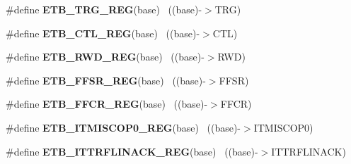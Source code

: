 \begin{DoxyCompactItemize}
\item 
\hypertarget{group___e_t_b___register___accessor___macros_ga01a52ef18993680d388fbd12372e86ca}{}\#define {\bfseries E\+T\+B\+\_\+\+T\+R\+G\+\_\+\+R\+E\+G}(base)                                            ~((base)-\/$>$T\+R\+G)\label{group___e_t_b___register___accessor___macros_ga01a52ef18993680d388fbd12372e86ca}

\item 
\hypertarget{group___e_t_b___register___accessor___macros_ga7a6e91a5568bfb417a9c335a6e43714f}{}\#define {\bfseries E\+T\+B\+\_\+\+C\+T\+L\+\_\+\+R\+E\+G}(base)                                            ~((base)-\/$>$C\+T\+L)\label{group___e_t_b___register___accessor___macros_ga7a6e91a5568bfb417a9c335a6e43714f}

\item 
\hypertarget{group___e_t_b___register___accessor___macros_ga0623a583f4196324a3f5ee3cac75f6a2}{}\#define {\bfseries E\+T\+B\+\_\+\+R\+W\+D\+\_\+\+R\+E\+G}(base)                                            ~((base)-\/$>$R\+W\+D)\label{group___e_t_b___register___accessor___macros_ga0623a583f4196324a3f5ee3cac75f6a2}

\item 
\hypertarget{group___e_t_b___register___accessor___macros_gac5eb4851d221fffa9d22249ba4956057}{}\#define {\bfseries E\+T\+B\+\_\+\+F\+F\+S\+R\+\_\+\+R\+E\+G}(base)                                          ~((base)-\/$>$F\+F\+S\+R)\label{group___e_t_b___register___accessor___macros_gac5eb4851d221fffa9d22249ba4956057}

\item 
\hypertarget{group___e_t_b___register___accessor___macros_ga5d2408136c4f7c21874acd9f3deaf79e}{}\#define {\bfseries E\+T\+B\+\_\+\+F\+F\+C\+R\+\_\+\+R\+E\+G}(base)                                          ~((base)-\/$>$F\+F\+C\+R)\label{group___e_t_b___register___accessor___macros_ga5d2408136c4f7c21874acd9f3deaf79e}

\item 
\hypertarget{group___e_t_b___register___accessor___macros_gafe482eb50c100470576834276ef1c897}{}\#define {\bfseries E\+T\+B\+\_\+\+I\+T\+M\+I\+S\+C\+O\+P0\+\_\+\+R\+E\+G}(base)                                ~((base)-\/$>$I\+T\+M\+I\+S\+C\+O\+P0)\label{group___e_t_b___register___accessor___macros_gafe482eb50c100470576834276ef1c897}

\item 
\hypertarget{group___e_t_b___register___accessor___macros_ga7014ba8506cf68b2b1a077f769f05182}{}\#define {\bfseries E\+T\+B\+\_\+\+I\+T\+T\+R\+F\+L\+I\+N\+A\+C\+K\+\_\+\+R\+E\+G}(base)                            ~((base)-\/$>$I\+T\+T\+R\+F\+L\+I\+N\+A\+C\+K)\label{group___e_t_b___register___accessor___macros_ga7014ba8506cf68b2b1a077f769f05182}


\end{DoxyCompactItemize}
